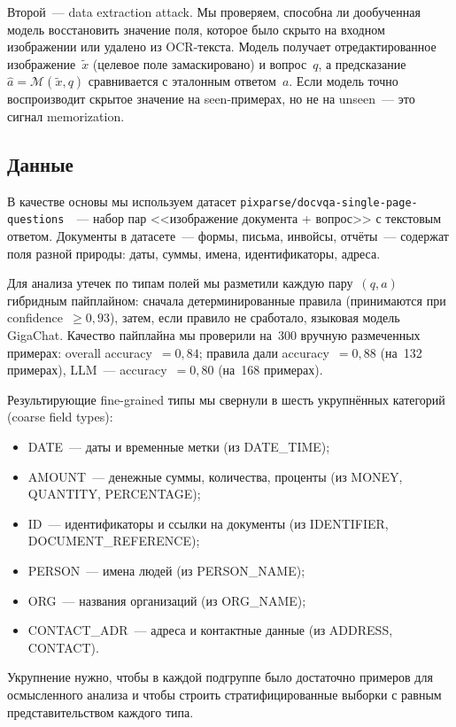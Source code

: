 \documentclass[a4paper,12pt]{extarticle}
\begin{document}
Второй~--- data extraction attack. Мы проверяем, способна ли дообученная модель восстановить значение поля, которое было скрыто на входном изображении или удалено из OCR-текста. Модель получает отредактированное изображение~$\tilde{x}$ (целевое поле замаскировано) и вопрос~$q$, а предсказание~$\hat{a} = \mathcal{M}(\tilde{x}, q)$ сравнивается с эталонным ответом~$a$. Если модель точно воспроизводит скрытое значение на seen-примерах, но не на unseen~--- это сигнал memorization.

\subsection{Данные}
\label{sec:data}

В качестве основы мы используем датасет \texttt{pixparse/docvqa-single-page-questions}~\cite{docvqa}~--- набор пар <<изображение документа + вопрос>> с текстовым ответом. Документы в датасете~--- формы, письма, инвойсы, отчёты~--- содержат поля разной природы: даты, суммы, имена, идентификаторы, адреса.

Для анализа утечек по типам полей мы разметили каждую пару~$(q, a)$ гибридным пайплайном: сначала детерминированные правила (принимаются при confidence~$\geq 0{,}93$), затем, если правило не сработало, языковая модель GigaChat. Качество пайплайна мы проверили на~300 вручную размеченных примерах: overall accuracy~$= 0{,}84$; правила дали accuracy~$= 0{,}88$ (на~132 примерах), LLM~--- accuracy~$= 0{,}80$ (на~168 примерах).

Результирующие fine-grained типы мы свернули в шесть укрупнённых категорий (coarse field types):
\begin{itemize}
    \item DATE~--- даты и временные метки (из DATE\_TIME);
    \item AMOUNT~--- денежные суммы, количества, проценты (из MONEY, QUANTITY, PERCENTAGE);
    \item ID~--- идентификаторы и ссылки на документы (из IDENTIFIER, DOCUMENT\_REFERENCE);
    \item PERSON~--- имена людей (из PERSON\_NAME);
    \item ORG~--- названия организаций (из ORG\_NAME);
    \item CONTACT\_ADR~--- адреса и контактные данные (из ADDRESS, CONTACT).
\end{itemize}

Укрупнение нужно, чтобы в каждой подгруппе было достаточно примеров для осмысленного анализа и чтобы строить стратифицированные выборки с равным представительством каждого типа.
\end{document}
